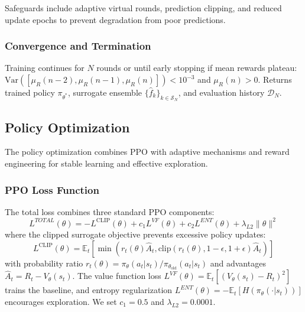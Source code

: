 \documentclass[conference]{IEEEtran}
\begin{document}
Safeguards include adaptive virtual rounds, prediction clipping, and reduced update epochs to prevent degradation from poor predictions.

\subsubsection{Convergence and Termination}

Training continues for $N$ rounds or until early stopping if mean rewards plateau: $\text{Var}([\mu_R(n-2), \mu_R(n-1), \mu_R(n)]) < 10^{-3}$ and $\mu_R(n) > 0$. Returns trained policy $\pi_{\theta^*}$, surrogate ensemble $\{\hat{f}_k\}_{k \in \mathcal{S}_N}$, and evaluation history $\mathcal{D}_N$.








\subsection{Policy Optimization}

The policy optimization combines PPO with adaptive mechanisms and reward engineering for stable learning and effective exploration.

\subsubsection{PPO Loss Function}

The total loss combines three standard PPO components:
%
\begin{equation}
L^{TOTAL}(\theta) = -L^{\text{CLIP}}(\theta) + c_1 L^{VF}(\theta) + c_2 L^{ENT}(\theta) + \lambda_{L2}\|\theta\|^2
\end{equation}
%
where the clipped surrogate objective prevents excessive policy updates:
%
\begin{equation}
L^{\text{CLIP}}(\theta) = \mathbb{E}_t\left[\min\left(r_t(\theta)\hat{A}_t, \text{clip}(r_t(\theta), 1-\epsilon, 1+\epsilon)\hat{A}_t\right)\right]
\end{equation}
%
with probability ratio $r_t(\theta) = \pi_{\theta}(a_t|s_t)/\pi_{\theta_{\text{old}}}(a_t|s_t)$ and advantages $\hat{A}_t = R_t - V_{\theta}(s_t)$. The value function loss $L^{VF}(\theta) = \mathbb{E}_t[(V_{\theta}(s_t) - R_t)^2]$ trains the baseline, and entropy regularization $L^{ENT}(\theta) = -\mathbb{E}_t[H(\pi_{\theta}(\cdot|s_t))]$ encourages exploration. We set $c_1 = 0.5$ and $\lambda_{L2} = 0.0001$.
\end{document}
